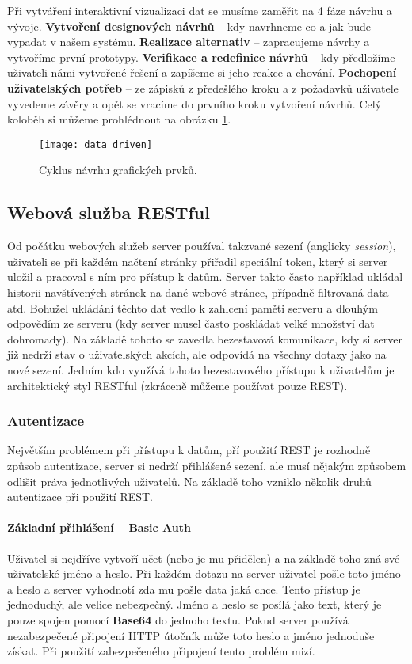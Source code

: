 \par Při vytváření interaktivní vizualizaci dat se musíme zaměřit na 4 fáze návrhu a vývoje. \textbf{Vytvoření designových návrhů} -- kdy navrhneme co a jak bude vypadat v našem systému. \textbf{Realizace alternativ} -- zapracujeme návrhy a vytvoříme první prototypy. \textbf{Verifikace a redefinice návrhů} -- kdy předložíme uživateli námi vytvořené řešení a zapíšeme si jeho reakce a chování. \textbf{Pochopení uživatelských potřeb} -- ze zápisků z předešlého kroku a z požadavků uživatele vyvedeme závěry a opět se vracíme do prvního kroku vytvoření návrhů. Celý koloběh si můžeme prohlédnout na obrázku \ref{data-cycle}. \cite{the-ux-book}

\begin{figure}[h]
\centering
\texttt{[image: data\_driven]}
\caption{Cyklus návrhu grafických prvků.}
\label{data-cycle}
\end{figure}

\subsection{Webová služba RESTful}
\par Od počátku webových služeb server používal takzvané sezení (anglicky \textit{session}), uživateli se při každém načtení stránky přiřadil speciální token, který si server uložil a pracoval s ním pro přístup k datům. Server takto často například ukládal historii navštívených stránek na dané webové stránce, případně filtrovaná data atd. Bohužel ukládání těchto dat vedlo k zahlcení paměti serveru a dlouhým odpovědím ze serveru (kdy server musel často poskládat velké množství dat dohromady). Na základě tohoto se zavedla bezestavová komunikace, kdy si server již nedrží stav o uživatelských akcích, ale odpovídá na všechny dotazy jako na nové sezení. Jedním kdo využívá tohoto bezestavového přístupu k uživatelům je architektický styl RESTful (zkráceně můžeme používat pouze REST). \cite{rest-cookbook}

\subsubsection{Autentizace}
Největším problémem při přístupu k datům, pří použití REST je rozhodně způsob autentizace, server si nedrží přihlášené sezení, ale musí nějakým způsobem odlišit práva jednotlivých uživatelů. Na základě toho vzniklo několik druhů autentizace při použití REST. \cite{rest-cookbook}

\paragraph{Základní přihlášení -- Basic Auth} Uživatel si nejdříve vytvoří učet (nebo je mu přidělen) a na základě toho zná své uživatelské jméno a heslo. Při každém dotazu na server uživatel pošle toto jméno a heslo a server vyhodnotí zda mu pošle data jaká chce. Tento přístup je jednoduchý, ale velice nebezpečný. Jméno a heslo se posílá jako text, který je pouze spojen pomocí \textbf{Base64} do jednoho textu. Pokud server používá nezabezpečené připojení HTTP útočník může toto heslo a jméno jednoduše získat. Při použití zabezpečeného připojení tento problém mizí. \cite{rest-cookbook}

